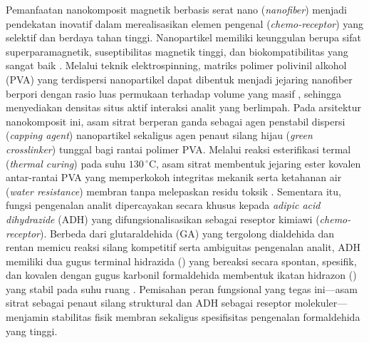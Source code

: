 Pemanfaatan nanokomposit magnetik berbasis serat nano (\textit{nanofiber}) menjadi pendekatan inovatif dalam merealisasikan elemen pengenal (\textit{chemo-receptor}) yang selektif dan berdaya tahan tinggi. Nanopartikel  memiliki keunggulan berupa sifat superparamagnetik, suseptibilitas magnetik tinggi, dan biokompatibilitas yang sangat baik \cite{antarnusa2022,ardiyanti2025}. Melalui teknik elektrospinning, matriks polimer polivinil alkohol (PVA) yang terdispersi nanopartikel  dapat dibentuk menjadi jejaring nanofiber berpori dengan rasio luas permukaan terhadap volume yang masif \cite{xue2019electrospinning,Turkoglu2024}, sehingga menyediakan densitas situs aktif interaksi analit yang berlimpah. Pada arsitektur nanokomposit ini, asam sitrat berperan ganda sebagai agen penstabil dispersi (\textit{capping agent}) nanopartikel  sekaligus agen penaut silang hijau (\textit{green crosslinker}) tunggal bagi rantai polimer PVA. Melalui reaksi esterifikasi termal (\textit{thermal curing}) pada suhu $130\,^{\circ}\mathrm{C}$, asam sitrat membentuk jejaring ester kovalen antar-rantai PVA yang memperkokoh integritas mekanik serta ketahanan air (\textit{water resistance}) membran tanpa melepaskan residu toksik \cite{shi2008citric,birck2014citric}. Sementara itu, fungsi pengenalan analit dipercayakan secara khusus kepada \textit{adipic acid dihydrazide} (ADH) yang difungsionalisasikan sebagai reseptor kimiawi (\textit{chemo-receptor}). Berbeda dari glutaraldehida (GA) yang tergolong dialdehida dan rentan memicu reaksi silang kompetitif serta ambiguitas pengenalan analit, ADH memiliki dua gugus terminal hidrazida () yang bereaksi secara spontan, spesifik, dan kovalen dengan gugus karbonil formaldehida membentuk ikatan hidrazon () yang stabil pada suhu ruang \cite{sigma_adh,gantrade_adh}. Pemisahan peran fungsional yang tegas ini---asam sitrat sebagai penaut silang struktural dan ADH sebagai reseptor molekuler---menjamin stabilitas fisik membran sekaligus spesifisitas pengenalan formaldehida yang tinggi.

